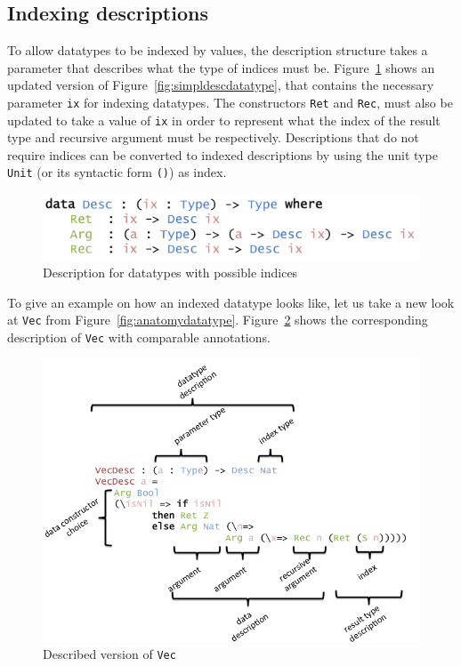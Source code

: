 \documentclass{ituthesis}
\newcommand{\ttconstructor}[1]{\textcolor{constructor-color}{\texttt{#1}}}
\newcommand{\tttype}[1]{\textcolor{type-color}{\texttt{#1}}}
\newcommand{\ttvar}[1]{\textcolor{local-var-color}{\texttt{#1}}}
\theoremstyle{break}
\begin{document}
\subsection{Indexing descriptions}
\label{sub:Indexingdescriptions}

To allow datatypes to be indexed by values, the description structure takes a parameter that describes what the type of indices must be.
Figure~\ref{fig:descriptiondatatype} shows an updated version of Figure~\ref{fig:simpldescdatatype}, that contains the necessary parameter \ttvar{ix} for indexing datatypes.
The constructors \ttconstructor{Ret} and \ttconstructor{Rec}, must also be updated to take a value of \ttvar{ix} in order to represent what the index of the result type and recursive argument must be respectively.
Descriptions that do not require indices can be converted to indexed descriptions by using the unit type \tttype{Unit} (or its syntactic form \tttype{()}) as index.

\begin{figure}[ht]
\begin{center}
    \includegraphics[scale=0.5]{Figures/ADescriptionforDatatypes.png}
\end{center}
\caption{Description for datatypes with possible indices}
\label{fig:descriptiondatatype}
\end{figure}

To give an example on how an indexed datatype looks like, let us take a new look at \tttype{Vec} from Figure~\ref{fig:anatomydatatype}.
Figure~\ref{fig:descvec} shows the corresponding description of \tttype{Vec} with comparable annotations.

\begin{figure}[ht]
\begin{center}
    \includegraphics[scale=0.5]{Figures/VectorDescription.png}
\end{center}
\caption{Described version of \tttype{Vec}}
\label{fig:descvec}
\end{figure}
\end{document}
